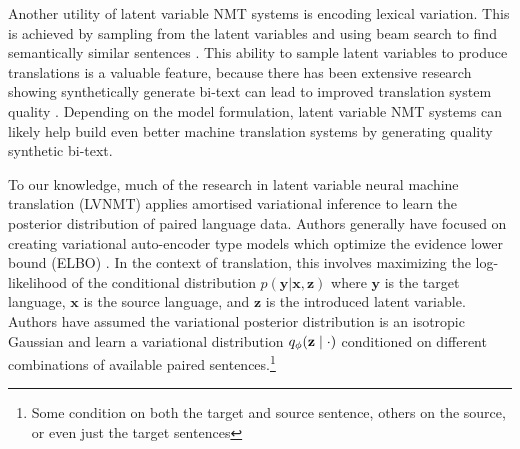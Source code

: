 Another utility of latent variable NMT systems is encoding lexical variation. This is achieved by sampling from the latent variables and using beam search to find semantically similar sentences \cite{schulz2018StochasticDecoder, shen2019diverse}. This ability to sample latent variables to produce translations is a valuable feature, because there has been extensive research showing synthetically generate bi-text can lead to improved translation system quality \cite{sennrich2015ImprovingNMT, edunov2018understandigBackTrans}. Depending on the model formulation, latent variable NMT systems can likely help build even better machine translation systems by generating quality synthetic bi-text. 


To our knowledge, much of the research in latent variable neural machine translation (LVNMT) applies amortised variational inference to learn the posterior distribution of paired language data. Authors generally have focused on creating variational auto-encoder type models which optimize the evidence lower bound (ELBO) \cite{ kingma2014autoencodingVB, rezende2014stochasticBackprop}. In the context of translation, this involves maximizing the log-likelihood of the conditional distribution $p(\textbf{y} | \textbf{x}, \textbf{z})$ where $\textbf{y}$ is the target language, $\textbf{x}$ is the source language, and $\textbf{z}$ is the introduced latent variable. Authors have assumed the variational posterior distribution is an isotropic Gaussian and learn a variational distribution $q_{\phi}(\textbf{z}\; | \;{\cdot})$ conditioned on different combinations of available paired sentences.\footnote{ Some condition on both the target and source sentence, others on the source, or even just the target sentences} 

